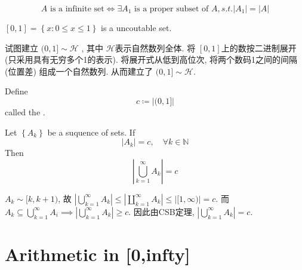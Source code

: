 \documentclass[../main.tex]{subfiles}
\begin{document}
\begin{theorem}{}{}
    \[
   A\text{ is a infinite set} \iff  \exists A_1 \text{ is a proper subset of }A, s.t. \left| A_1 \right|= \left| A \right|  
    \]
\end{theorem}

\begin{theorem}{}{}
    \(  \left[ 0,1 \right]= \left\{ x:0\le x\le 1 \right\}   \) is a uncoutable set. 
\end{theorem}
\begin{proofsketch}
   试图建立 \(  (0,1]\sim \mathscr{H}  \)  , 其中 \(  \mathscr{H}  \)表示自然数列全体. 将 \(  \left[ 0,1 \right]   \)上的数按二进制展开(只采用具有无穷多个1的表示). 将展开式从低到高位次, 将两个数码1之间的间隔(位置差) 组成一个自然数列. 从而建立了 \(  (0,1]\sim  \mathscr{H}  \).  
\end{proofsketch}

\begin{definition}{}{}
    Define \[
    c\coloneqq \left| (0,1] \right| 
    \] called the .
\end{definition}
\begin{theorem}{}{}
    Let \(  \left\{ A_{k} \right\}  \) be a suquence of sets. If \[
    \left| A_{k} \right|= c,\quad \forall k\in \mathbb{N}  
    \]Then \[
    \left| \bigcup _{k= 1}^{\infty}A_{k} \right|= c 
    \] 
\end{theorem}
\begin{proofsketch}
     \(  A_{k}\sim [ k,k+ 1 )   \), 故 \(  \left| \bigcup _{k= 1}^{\infty}A_{k} \right|\le \left| \coprod  _{k= 1}^{\infty}A_{k} \right|\le  \left| [1,\infty) \right|= c    \). 而 \(  A_{k}\subseteq \bigcup _{k= 1}^{\infty}A_{i}\implies  \left| \bigcup _{k= 1}^{\infty}A_{k} \right|\ge c   \). 因此由CSB定理, \(  \left| \bigcup _{k= 1}^{\infty}A_{k} \right|= c   \).   
\end{proofsketch}
 

\section{Arithmetic in   [0,infty]    } 
\end{document}
